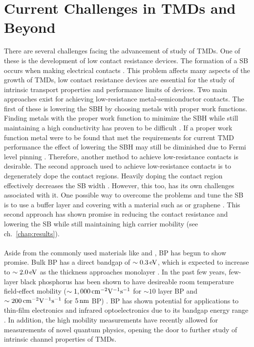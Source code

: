 \section{Current Challenges in \acp{TMD} and Beyond}\label{sec:tmds_and_beyond}
There are several challenges facing the advancement of study of \acp{TMD}. One of these is the development of low contact resistance devices. The formation of a \ac{SB} occurs when making electrical contacts \cite{Fang_NanoLett2012,Das_AppPhysLett2013}. This problem affects many aspects of the growth of \acp{TMD}, low contact resistance devices are essential for the study of intrinsic transport properties and performance limits of devices. Two main approaches exist for achieving low-resistance metal-semiconductor contacts. The first of these is lowering the \ac{SBH} by choosing metals with proper work functions. Finding metals with the proper work function to minimize the \acs{SBH} while still maintaining a high conductivity has proven to be difficult \cite{Liu_ACSnano2012,Das_NanoLett2012}. If a proper work function metal were to be found that met the requirements for current \acs{TMD} performance the effect of lowering the \acs{SBH} may still be diminished due to Fermi level pinning \cite{Gong_NanoLett2014}. Therefore, another method to achieve low-resistance contacts is desirable. The second approach used to achieve low-resistance contacts is to degenerately dope the contact regions. Heavily doping the contact region effectively decreases the \acs{SB} width \cite{Suh_NanoLett2014}. However, this too, has its own challenges associated with it. One possible way to overcome the problems and tune the \acs{SB} is to use a buffer layer and covering with a material such as \hbn or graphene \cite{Geim_Nature2013,Farmanbar_PhysRevB2015,Kappera_NatureMat2014,Farmanbar_arxiv2016}. This second approach has shown promise in reducing the contact resistance and lowering the \acs{SB} while still maintaining high carrier mobility (see ch.~\ref{chap:results}). \\ \\

\noindent Aside from the commonly used \td materials like  and , \ac{BP} has begun to show promise. Bulk \acs{BP} has a direct bandgap of $\sim 0.3\,\mathrm{eV}$, which is expected to increase to $\sim 2.0\,\mathrm{eV}$ as the thickness approaches monolayer \cite{Keyes_PhysRev1953,Maruyama_PhysB1981,Tran_PhysRevB2014}. In the past few years, few-layer black phosphorus has been shown to have desireable room temperature field-effect mobility ($\sim 1,000\,\mathrm{cm}^{-2}\mathrm{V}^{-1}\mathrm{s}^{-1}$ for $\sim 10$ layer \acs{BP} and $\sim 200\,\mathrm{cm}^{-2}\mathrm{V}^{-1}\mathrm{s}^{-1}$ for $5\,\mathrm{nm}$ \acs{BP}) \cite{Li_NatureNano2014,Koenig_AppPhysLett2014,Xia_NatureComm2014}. \acs{BP} has shown potential for applications to thin-film electronics and infrared optoelectronics due to its bandgap energy range \cite{Li_NatureNano2015,Xia_NatureComm2014}. In addition, the high mobility measurements have recently allowed for measurements of novel quantum physics, opening the door to further study of intrinsic channel properties of \acp{TMD}.


